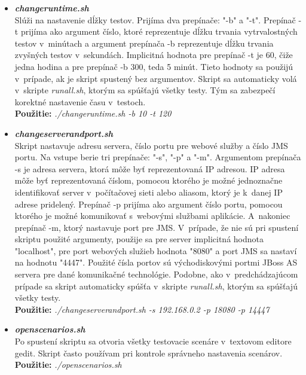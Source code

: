 \documentclass[12pt,oneside,final]{fithesis-utf8}
\newcommand\underscore[1]{\underline{\hspace{8pt}}}
\begin{document}
\begin{itemize}
\item \textit{\textbf{change\underscore{}runtime.sh}}\\
Slúži na nastavenie dĺžky testov. Prijíma dva prepínače: "{}-b"{} a "{}-t"{}. Prepínač -t prijíma ako argument číslo, ktoré reprezentuje dĺžku trvania vytrvalostných testov v~minútach a argument prepínača -b reprezentuje dĺžku trvania zvyšných testov v~sekundách. Implicitná hodnota pre prepínač -t je 60, čiže jedna hodina a pre prepínač -b 300, teda 5 minút. Tieto hodnoty sa použijú v~prípade, ak je skript spustený bez argumentov. Skript sa automaticky volá v~skripte \textit{run\underscore{}all.sh}, ktorým sa spúšťajú všetky testy. Tým sa zabezpečí korektné nastavenie času v~testoch.\\
\textbf{Použitie:} \textit{./change\underscore{}runtime.sh -b 10 -t 120}

\item \textit{\textbf{change\underscore{}server\underscore{}and\underscore{}port.sh}}\\
Skript nastavuje adresu servera, číslo portu pre webové služby a číslo JMS portu. Na vstupe berie tri prepínače: "{}-s"{}, "{}-p"{} a "{}-m"{}. Argumentom prepínača -s je adresa servera, ktorá môže byť reprezentovaná IP adresou. IP adresa môže byť reprezentovaná číslom, pomocou ktorého je možné jednoznačne identifikovať server v~počítačovej sieti alebo aliasom, ktorý je k~danej IP adrese pridelený. Prepínač -p prijíma ako argument číslo portu, pomocou ktorého je možné komunikovať s~webovými službami aplikácie. A~nakoniec prepínač -m, ktorý nastavuje port pre JMS. V~prípade, že nie sú pri spustení skriptu použité argumenty, použije sa pre server implicitná hodnota "{}localhost"{}, pre port webových služieb hodnota "{}8080"{} a port JMS sa nastaví na hodnotu "{}4447"{}. Použité čísla portov sú východiskovými portmi JBoss AS servera pre dané komunikačné technológie. Podobne, ako v~predchádzajúcom prípade sa skript automaticky spúšťa v~skripte \textit{run\underscore{}all.sh}, ktorým sa spúšťajú všetky testy.\\
\textbf{Použitie:} \textit{./change\underscore{}server\underscore{}and\underscore{}port.sh -s 192.168.0.2 -p 18080 -p 14447}

\item \textit{\textbf{open\underscore{}scenarios.sh}}\\
Po spustení skriptu sa otvoria všetky testovacie scenáre v~textovom editore gedit. Skript často používam pri kontrole správneho nastavenia scenárov.\\
\textbf{Použitie:} \textit{./open\underscore{}scenarios.sh}



\end{itemize}
\end{document}
